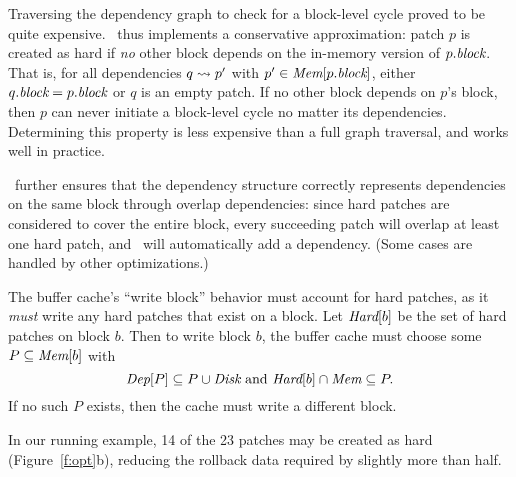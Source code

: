 Traversing the dependency graph to check for a block-level cycle
proved to be quite expensive.
%
\Kudos\ thus implements a conservative approximation: patch $p$ is
created as hard if \emph{no} other block depends on the in-memory
version of $p.\textit{block}$.
%
That is, for all dependencies $q \leadsto p'$ with $p' \in
\PMem[\PBlock{p}]$, either $q.\textit{block} = p.\textit{block}$ or $q$ is an empty
patch.
%
If no other block depends on $p$'s block, then $p$ can never initiate a
block-level cycle no matter its dependencies.
%
Determining this property is less expensive than a full graph
traversal, and works well in practice.


\Kudos\ further ensures that the dependency structure correctly
represents dependencies on the same block through overlap
dependencies: since hard patches are considered to cover the entire
block, every succeeding patch will overlap at least one hard patch,
and \Kudos\ will automatically add a dependency.
%
(Some cases are handled by other optimizations.)


The buffer cache's ``write block'' behavior must account for hard
patches, as it \emph{must} write any hard patches that exist on a
block.
%
Let $\PHard[b]$ be the set of hard patches on block $b$.
%
Then to write block $b$, the buffer cache must choose some $P \subseteq
\PMem[b]$ with
%
\[ \PDepset{P} \subseteq P \cup \PDisk \text{ and } \PHard[b] \cap \PMem
\subseteq P. \]
%
If no such $P$ exists, then the cache must write a different block.


In our running example, 14 of the 23 patches may be created as hard
(Figure~\ref{f:opt}b),
%
reducing the rollback data required by slightly more than half.


